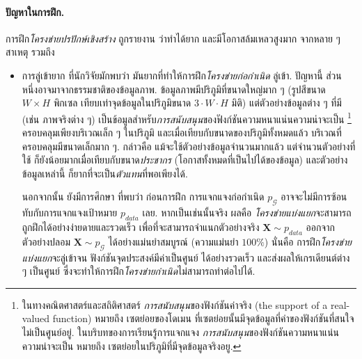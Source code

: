 


\paragraph{ปัญหาในการฝึก.}
%
การฝึก\textit{โครงข่ายปรปักษ์เชิงสร้าง} ถูกรายงาน\cite{DCGAN, OverviewGAN2018} ว่าทำได้ยาก และมีโอกาสล้มเหลวสูงมาก
จากหลาย ๆ สาเหตุ รวมถึง
\begin{itemize}
\item การลู่เข้ายาก\cite{DCGAN} ที่นักวิจัยมักพบว่า มันยากที่ทำให้การฝึก\textit{โครงข่ายก่อกำเนิด} 
ลู่เข้า.
ปัญหานี้ ส่วนหนึ่งอาจมาจากธรรมชาติของข้อมูลภาพ. 
ข้อมูลภาพมีปริภูมิที่ขนาดใหญ่มาก ๆ (รูปสีขนาด $W \times H$ พิกเซล เทียบเท่าจุดข้อมูลในปริภูมิขนาด $3 \cdot W \cdot H$ มิติ)
แต่ตัวอย่างข้อมูลต่าง ๆ ที่มี (เช่น ภาพจริงต่าง ๆ) เป็นข้อมูลสำหรับ\textit{การสนับสนุน}ของฟังก์ชันความหนาแน่นความน่าจะเป็น%
\footnote{%
ในทางคณิตศาสตร์และสถิติศาสตร์ 
\textit{การสนับสนุน}ของฟังก์ชันค่าจริง (the support of a real-valued function) 
หมายถึง เซตย่อยของโดเมน ที่เซตย่อยนั้นมีจุดข้อมูลที่ค่าของฟังก์ชันที่สนใจไม่เป็นศูนย์อยู่.
ในบริบทของการเรียนรู้การแจกแจง \textit{การสนับสนุน}ของฟังก์ชันความหนาแน่นความน่าจะเป็น หมายถึง
เซตย่อยในปริภูมิที่มีจุดข้อมูลจริงอยู.
}%
ครอบคลุมเพียงบริเวณเล็ก ๆ ในปริภูมิ และเมื่อเทียบกับขนาดของปริภูมิทั้งหมดแล้ว บริเวณที่ครอบคลุมมีขนาดเล็กมาก ๆ.
กล่าวคือ แม้จะใช้ตัวอย่างข้อมูลจำนวนมากแล้ว แต่จำนวนตัวอย่างที่ใช้ ก็ยังน้อยมากเมื่อเทียบกับขนาด\textit{ประชากร} (โอกาสทั้งหมดที่เป็นไปได้ของข้อมูล) และตัวอย่างข้อมูลเหล่านี้ ก็ยากที่จะเป็น\textit{ตัวแทน}ที่พอเพียงได้. 
%

นอกจากนั้น ยังมีการศึกษา\cite{OverviewGAN2018, ArjovskyEtAl2016} ที่พบว่า ก่อนการฝึก
การแจกแจงก่อกำเนิด $p_{\mathcal{G}}$ อาจจะไม่มีการซ้อนทับกับการแจกแจงเป้าหมาย $p_{data}$ เลย.
หากเป็นเช่นนั้นจริง ผลคือ \textit{โครงข่ายแบ่งแยก}จะสามารถถูกฝึกได้อย่างง่ายดายและรวดเร็ว 
เพื่อที่จะสามารถจำแนกตัวอย่างจริง $\bm{X} \sim p_{data}$ ออกจากตัวอย่างปลอม $\bm{X} \sim p_{\mathcal{G}}$
ได้อย่างแม่นยำสมบูรณ์ (ความแม่นยำ $100\%$)
นั่นคือ การฝึก\textit{โครงข่ายแบ่งแยก}จะลู่เข้าจน ฟังก์ชันจุดประสงค์มีค่าเป็นศูนย์ ได้อย่างรวดเร็ว
และส่งผลให้เกรเดียนต์ต่าง ๆ เป็นศูนย์ ซึ่งจะทำให้การฝึก\textit{โครงข่ายกำเนิด}ไม่สามารถทำต่อไปได้.


\end{itemize}
